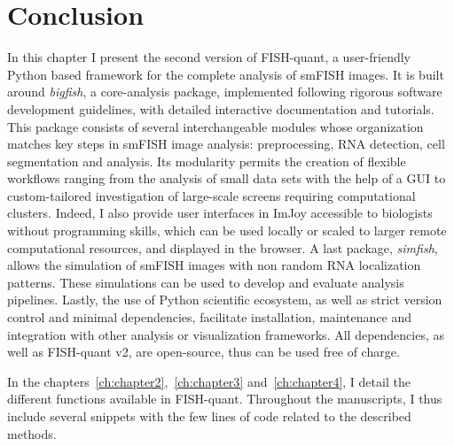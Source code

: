 \section{Conclusion}
\label{sec:conclusion}

In this chapter I present the second version of FISH-quant, a user-friendly Python based framework for the complete analysis of \ac{smFISH} images.
It is built around \emph{bigfish}, a core-analysis package, implemented following rigorous software development guidelines, with detailed interactive documentation and tutorials.
This package consists of several interchangeable modules whose organization matches key steps in \ac{smFISH} image analysis: preprocessing, \ac{RNA} detection, cell segmentation and analysis.
Its modularity permits the creation of flexible workflows ranging from the analysis of small data sets with the help of a \ac{GUI} to custom-tailored investigation of large-scale screens requiring computational clusters.
Indeed, I also provide user interfaces in ImJoy accessible to biologists without programming skills, which can be used locally or scaled to larger remote computational resources, and displayed in the browser.
A last package, \emph{simfish}, allows the simulation of \ac{smFISH} images with non random \ac{RNA} localization patterns.
These simulations can be used to develop and evaluate analysis pipelines.
Lastly, the use of Python scientific ecosystem, as well as strict version control and minimal dependencies, facilitate installation, maintenance and integration with other analysis or visualization frameworks.
All dependencies, as well as FISH-quant v2, are open-source, thus can be used free of charge.

In the chapters~\ref{ch:chapter2},~\ref{ch:chapter3} and~\ref{ch:chapter4}, I detail the different functions available in FISH-quant.
Throughout the manuscripts, I thus include several snippets with the few lines of code related to the described methods.
